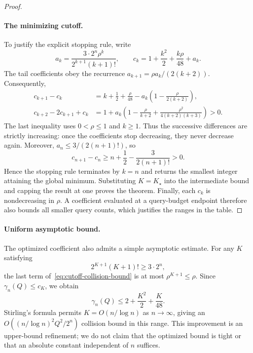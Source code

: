 \documentclass[11pt,letterpaper]{article}
\theoremstyle{definition} %
\begin{document}
\begin{proof}
\paragraph{The minimizing cutoff.}
To justify the explicit stopping rule, write
\[
 a_k=\frac{3\cdot2^n\rho^k}{2^{k+1}(k+1)!},
 \qquad c_k=1+\frac{k^2}{2}+\frac{k\rho}{48}+a_k.
\]
The tail coefficients obey the recurrence
$a_{k+1}=\rho a_k/(2(k+2))$. Consequently,
\begin{align*}
 c_{k+1}-c_k
 &=k+\frac12+\frac{\rho}{48}
       -a_k\left(1-\frac{\rho}{2(k+2)}\right),\\
 c_{k+2}-2c_{k+1}+c_k
 &=1+a_k\left(1-\frac{\rho}{k+2}
                 +\frac{\rho^2}{4(k+2)(k+3)}\right)>0.
\end{align*}
The last inequality uses $0<\rho\leq1$ and $k\geq1$. Thus the
successive differences are strictly increasing: once the coefficients
stop decreasing, they never decrease again. Moreover,
$a_n\leq3/(2(n+1)!)$, so
\[
 c_{n+1}-c_n
 \geq n+\frac12-\frac{3}{2(n+1)!}>0.
\]
Hence the stopping rule terminates by $k=n$ and returns the smallest
integer attaining the global minimum. Substituting $K=K_\star$ into
the intermediate bound and capping the result at one proves the theorem.
Finally, each $c_k$ is nondecreasing in $\rho$. A coefficient evaluated
at a query-budget endpoint therefore also bounds all smaller query
counts, which justifies the ranges in the table.
\end{proof}

\paragraph{Uniform asymptotic bound.}
The optimized coefficient also admits a simple asymptotic estimate.
For any $K$ satisfying
\[
 2^{K+1}(K+1)!\geq3\cdot2^n,
\]
the last term of~\eqref{eq:cutoff-collision-bound} is at most
$\rho^{K+1}\leq\rho$. Since $\gamma_n(Q)\leq c_K$, we obtain
\begin{equation}
 \gamma_n(Q)\leq2+\frac{K^2}{2}+\frac{K}{48}.
 \label{eq:t5-uniform-cutoff}
\end{equation}
Stirling's formula permits $K=O(n/\log n)$ as $n\to\infty$, giving
an $O((n/\log n)^2Q^2/2^n)$ collision bound in this range.
This improvement is an upper-bound refinement; we do not claim that the
optimized bound is tight or that an absolute constant independent of $n$
suffices.
\end{document}
